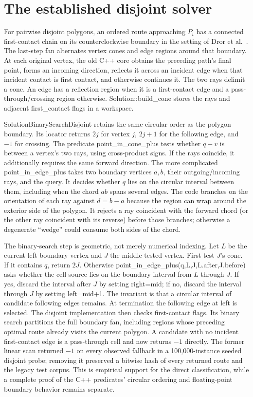 \documentclass[12pt,a4paper]{article}
\newcommand{\code}[1]{{\ttfamily\color{codekw}#1}}
\begin{document}
\section{The established disjoint solver}
For pairwise disjoint polygons, an ordered route approaching \(P_i\) has a connected first-contact chain on its counterclockwise boundary in the setting of Dror et al.~\cite{dror03}. The last-step fan alternates vertex cones and edge regions around that boundary. At each original vertex, the old C++ core obtains the preceding path's final point, forms an incoming direction, reflects it across an incident edge when that incident contact is first contact, and otherwise continues it. The two rays delimit a cone. An edge has a reflection region when it is a first-contact edge and a pass-through/crossing region otherwise. \code{Solution::build\_cone} stores the rays and adjacent \code{first\_contact} flags in a workspace.

\code{SolutionBinarySearchDisjoint} retains the same circular order as the polygon boundary. Its locator returns \(2j\) for vertex \(j\), \(2j+1\) for the following edge, and \(-1\) for crossing. The predicate \code{point\_in\_cone\_plus} tests whether \(q-v\) is between a vertex's two rays, using cross-product signs. If the rays coincide, it additionally requires the same forward direction. The more complicated \code{point\_in\_edge\_plus} takes two boundary vertices \(a,b\), their outgoing/incoming rays, and the query. It decides whether \(q\) lies on the circular interval between them, including when the chord \(ab\) spans several edges. The code branches on the orientation of each ray against \(d=b-a\) because the region can wrap around the exterior side of the polygon. It rejects a ray coincident with the forward chord (or the other ray coincident with its reverse) before those branches; otherwise a degenerate ``wedge'' could consume both sides of the chord.

The binary-search step is geometric, not merely numerical indexing. Let \(L\) be the current left boundary vertex and \(J\) the middle tested vertex. First test \(J\)'s cone. If it contains \(q\), return \(2J\). Otherwise \code{point\_in\_edge\_plus(q,L,J,L.after,J.before)} asks whether the cell source lies on the boundary interval from \(L\) through \(J\). If yes, discard the interval after \(J\) by setting \code{right=mid}; if no, discard the interval through \(J\) by setting \code{left=mid+1}. The invariant is that a circular interval of candidate following edges remains. At termination the following edge at \code{left} is selected. The disjoint implementation then checks first-contact flags. Its binary search partitions the full boundary fan, including regions whose preceding optimal route already visits the current polygon. A candidate with no incident first-contact edge is a pass-through cell and now returns \(-1\) directly. The former linear scan returned \(-1\) on every observed fallback in a 100,000-instance seeded disjoint probe; removing it preserved a bitwise hash of every returned route and the legacy test corpus. This is empirical support for the direct classification, while a complete proof of the C++ predicates' circular ordering and floating-point boundary behavior remains separate.
\end{document}
